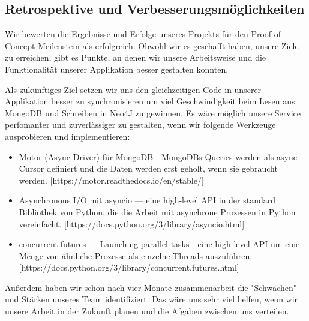 \subsection{Retrospektive und Verbesserungsmöglichkeiten}
Wir bewerten die Ergebnisse und Erfolge unseres Projekts für den Proof-of-Concept-Meilenstein als erfolgreich. Obwohl wir es geschafft haben, unsere Ziele zu erreichen, gibt es Punkte, an denen wir unsere Arbeitsweise und die Funktionalität unserer Applikation besser gestalten konnten.

Als zukünftiges Ziel setzen wir uns den gleichzeitigen Code in unserer Applikation besser zu synchronisieren um viel Geschwindigkeit beim Lesen aus MongoDB und Schreiben in Neo4J zu gewinnen. Es wäre möglich unsere Service perfomanter und zuverlässiger zu gestalten, wenn wir folgende Werkzeuge ausprobieren und implementieren:
\begin{itemize}
    \item Motor (Async Driver) für MongoDB - MongoDBs Queries werden als async Cursor definiert und die Daten werden erst geholt, wenn sie gebraucht werden. [https://motor.readthedocs.io/en/stable/]
    \item Asynchronous I/O mit asyncio — eine high-level API in der standard Bibliothek von Python, die die Arbeit mit asynchrone Prozessen in Python vereinfacht. [https://docs.python.org/3/library/asyncio.html]
    \item concurrent.futures — Launching parallel tasks - eine high-level API um eine Menge von ähnliche Prozesse als einzelne Threads auszuführen. [https://docs.python.org/3/library/concurrent.futures.html]
\end{itemize}
Außerdem haben wir schon nach vier Monate zusammenarbeit die "Schwächen" und Stärken unseres Team identifiziert. Das wäre uns sehr viel helfen, wenn wir unsere Arbeit in der Zukunft planen und die Afgaben zwischen uns verteilen.


%
%
